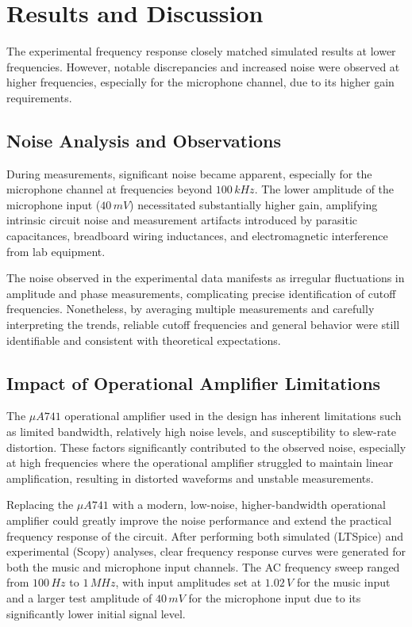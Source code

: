 \documentclass[12pt]{article}
\begin{document}
\section{Results and Discussion}

The experimental frequency response closely matched simulated results at lower frequencies. However, notable discrepancies and increased noise were observed at higher frequencies, especially for the microphone channel, due to its higher gain requirements.

\subsection{Noise Analysis and Observations}

During measurements, significant noise became apparent, especially for the microphone channel at frequencies beyond $100\,kHz$. The lower amplitude of the microphone input ($40\,mV$) necessitated substantially higher gain, amplifying intrinsic circuit noise and measurement artifacts introduced by parasitic capacitances, breadboard wiring inductances, and electromagnetic interference from lab equipment.

The noise observed in the experimental data manifests as irregular fluctuations in amplitude and phase measurements, complicating precise identification of cutoff frequencies. Nonetheless, by averaging multiple measurements and carefully interpreting the trends, reliable cutoff frequencies and general behavior were still identifiable and consistent with theoretical expectations.

\subsection{Impact of Operational Amplifier Limitations}

The $\mu A741$ operational amplifier used in the design has inherent limitations such as limited bandwidth, relatively high noise levels, and susceptibility to slew-rate distortion. These factors significantly contributed to the observed noise, especially at high frequencies where the operational amplifier struggled to maintain linear amplification, resulting in distorted waveforms and unstable measurements.

Replacing the $\mu A741$ with a modern, low-noise, higher-bandwidth operational amplifier could greatly improve the noise performance and extend the practical frequency response of the circuit.
After performing both simulated (LTSpice) and experimental (Scopy) analyses, clear frequency response curves were generated for both the music and microphone input channels. The AC frequency sweep ranged from $100\,Hz$ to $1\,MHz$, with input amplitudes set at $1.02\,V$ for the music input and a larger test amplitude of $40\,mV$ for the microphone input due to its significantly lower initial signal level.
\end{document}
